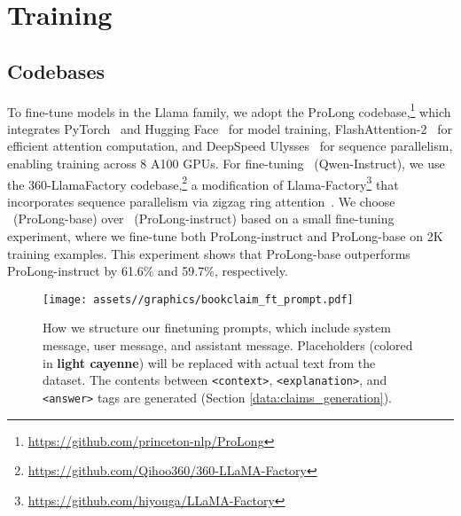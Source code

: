 \section{Training}

\subsection{Codebases} To fine-tune models in the Llama family, we adopt the ProLong codebase,\footnote{\href{https://github.com/princeton-nlp/ProLong}{https://github.com/princeton-nlp/ProLong}} which integrates PyTorch~\cite{paszke2019pytorchimperativestylehighperformance} and Hugging Face~\cite{wolf2020huggingfacestransformersstateoftheartnatural} for model training, FlashAttention-2~\cite{dao2023flashattention2fasterattentionbetter} for efficient attention computation, and DeepSpeed Ulysses~\cite{jacobs_deepspeed_2023} for sequence parallelism, enabling training across 8 A100 GPUs. For fine-tuning \qweninst\ (Qwen-Instruct), we use the 360-LlamaFactory codebase,\footnote{\href{https://github.com/Qihoo360/360-LLaMA-Factory}{https://github.com/Qihoo360/360-LLaMA-Factory}} a modification of Llama-Factory\footnote{\href{https://github.com/hiyouga/LLaMA-Factory}{https://github.com/hiyouga/LLaMA-Factory}} that incorporates sequence parallelism via zigzag ring attention~\cite{liu2023blockwise,liu2023ring}. We choose \prolongbase\ (ProLong-base) over \prolonginst\ (ProLong-instruct) based on a small fine-tuning experiment, where we fine-tune both ProLong-instruct and ProLong-base on 2K training examples. This experiment shows that ProLong-base outperforms ProLong-instruct by 61.6\% and 59.7\%, respectively. %

\begin{figure}[htbp]
    \centering
    \texttt{[image: assets//graphics/bookclaim\_ft\_prompt.pdf]}
    \caption{How we structure our finetuning prompts, which include system message, user message, and assistant message. Placeholders (colored in \textbf{\textcolor{lightcayenne}{light cayenne}}) will be replaced with actual text from the dataset. The contents between \texttt{<context>}, \texttt{<explanation>}, and \texttt{<answer>} tags are generated (Section \ref{data:claims_generation}).}
    \label{fig:sft_prompt}
\end{figure}
